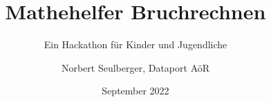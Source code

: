 \documentclass[12p,numbers=noendperiod,DIV=15]{scrartcl}
\begin{document}
	
\title{Mathehelfer Bruchrechnen}
\subtitle{Ein Hackathon für Kinder und Jugendliche}
\author{Norbert Seulberger, Dataport AöR}
\date{September 2022}

\maketitle

\tableofcontents






%
%


%









\end{document}
